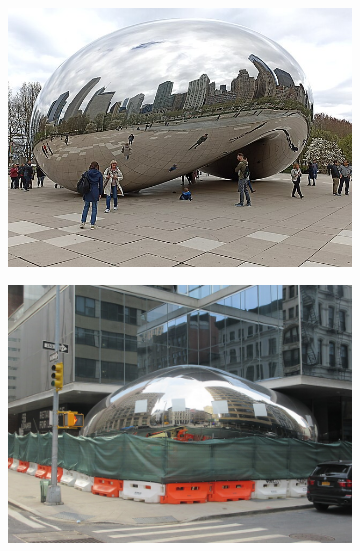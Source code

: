 \documentclass[%
reprint,
twocolumn,
nofootinbib,
 amsmath,amssymb,
 aps,
]{revtex4-2}
\begin{document}

\begin{figure}
    \begin{subfigure}{0.15\textwidth}
        \includegraphics[width=0.98\linewidth]{img/Cloud_Gate_1.jpg}
    \end{subfigure}
    \begin{subfigure}{0.15\textwidth}
        \includegraphics[width=0.98\linewidth]{img/nyc.jpg}

\end{subfigure}
\end{figure}
\end{document}
